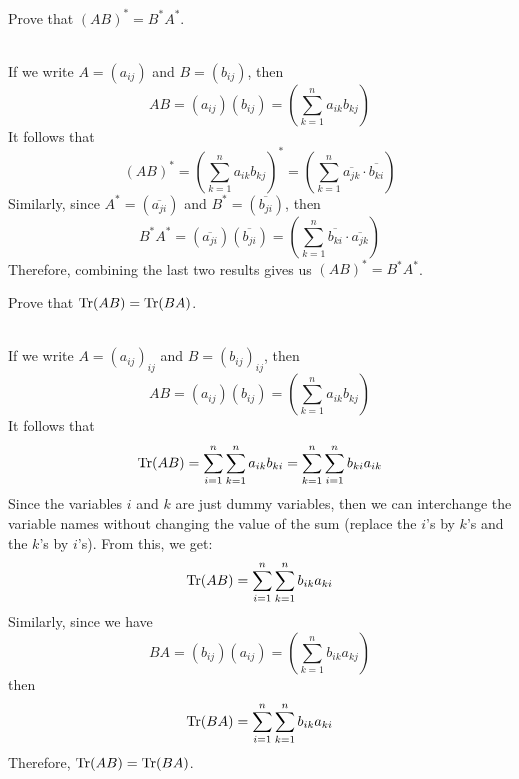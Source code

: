 \begin{solution}
    \\ \td \\
\end{solution}

\begin{exercise}
    Prove that $(AB)^* = B^* A^*$. \\
\end{exercise}

\begin{solution}
    \\ If we write $A = (a_{ij})$ and $B = (b_{ij})$, then
    $$AB = (a_{ij})(b_{ij}) = \left(\sum_{k=1}^{n}a_{ik}b_{kj}\right)$$
    It follows that
    $$(AB)^* =  \left(\sum_{k=1}^{n}a_{ik}b_{kj}\right)^* =  \left(\sum_{k=1}^{n}\overline{a_{jk}} \cdot \overline{b_{ki}}\right)$$
    Similarly, since $A^* = (\overline{a_{ji}})$ and $B^* = (\overline{b_{ji}})$, then
    $$B^*A^* = (\overline{a_{ji}}) (\overline{b_{ji}}) = \left(\sum_{k=1}^{n}\overline{b_{ki}} \cdot \overline{a_{jk}}\right)$$
    Therefore, combining the last two results gives us $(AB)^* = B^* A^*$.\\
\end{solution}

\begin{exercise}
    Prove that $\text{Tr}(AB)=\text{Tr}(BA)$.\\
\end{exercise}

\begin{solution}
    \\ If we write $A = (a_{ij})_{ij}$ and $B = (b_{ij})_{ij}$, then
    $$AB = (a_{ij})(b_{ij}) = \left(\sum_{k=1}^{n}a_{ik}b_{kj}\right)$$
    It follows that
    $$\text{Tr} (AB) = \sum_{i=1}^{n}\sum_{k=1}^{n}a_{ik}b_{ki} = \sum_{k=1}^{n}\sum_{i=1}^{n}b_{ki}a_{ik}$$
    Since the variables $i$ and $k$ are just dummy variables, then we can interchange the variable names without changing the value of the sum (replace the $i$'s by $k$'s and the $k$'s by $i$'s). From this, we get:
    $$\text{Tr} (AB) = \sum_{i=1}^{n}\sum_{k=1}^{n}b_{ik}a_{ki}$$
    Similarly, since we have
    $$BA = (b_{ij})(a_{ij}) = \left(\sum_{k=1}^{n}b_{ik}a_{kj}\right)$$
    then
    $$\text{Tr} (BA) = \sum_{i=1}^{n}\sum_{k=1}^{n}b_{ik}a_{ki}$$
    Therefore, $\text{Tr} (AB) = \text{Tr} (BA)$.\\
\end{solution}

\begin{exercise}
    \td \\
\end{exercise}

\begin{exercise}
    \td \\
\end{exercise}

\begin{exercise}
    \td \\
\end{exercise}

\begin{exercise}
    \td \\
\end{exercise}

